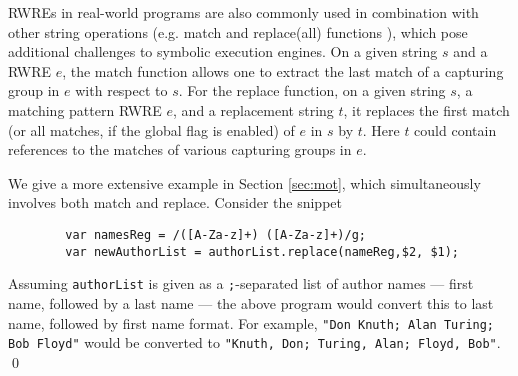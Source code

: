RWREs in real-world programs are also commonly used in combination with
other string operations (e.g. match and replace(all) functions \cite{LMK19}),
which pose additional challenges to symbolic execution engines.
On a given string $s$ and a RWRE $e$, the match function allows one to extract 
the last match of a capturing group in $e$ with respect to $s$. 
For the replace function, on a given string $s$, a matching pattern RWRE $e$, and a replacement string $t$, it replaces the first match (or all 
matches, if the global flag is enabled) of $e$ in $s$ by $t$. Here $t$
could contain references to the matches of various capturing groups
in $e$. 
\begin{example}\label{exmp-name-swap}
    We give a more extensive example in Section \ref{sec:mot}, which 
    simultaneously involves both match and replace. Consider the snippet
    \begin{verbatim}
        var namesReg = /([A-Za-z]+) ([A-Za-z]+)/g;
        var newAuthorList = authorList.replace(nameReg,$2, $1);
    \end{verbatim}
    Assuming \texttt{authorList} is given as a \texttt{;}-separated 
    list of author names --- first name, followed by a last name ---
    the above program would convert this to last name, followed by first name
    format. For example, \texttt{"Don Knuth; Alan Turing; Bob Floyd"} would
    be converted to \texttt{"Knuth, Don; Turing, Alan; Floyd, Bob"}.
    \qed
\end{example}


